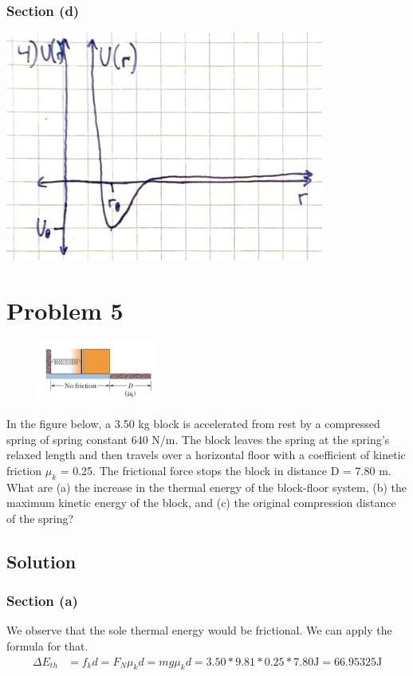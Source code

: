\documentclass[12pt]{article}
\begin{document}
\subsubsection*{Section (d)}
\begin{center} \includegraphics[height=0.4\textheight]{graph_4s.JPG} \end{center}


\pagebreak
\section*{Problem 5}
\begin{figure}
    \vspace{-30pt}
    \includegraphics[width=0.35\textwidth]{graph_5.png} 
\end{figure}
In the figure below, a 3.50 kg block is accelerated from rest by a compressed spring of spring constant 640 N/m. The block leaves the spring at the spring's relaxed length and then travels over a horizontal floor with a coefficient of kinetic friction $\mu_k$ = 0.25. The frictional force stops the block in distance D = 7.80 m. What are (a) the increase in the thermal energy of the block-floor system, (b) the maximum kinetic energy of the block, and (c) the original compression distance of the spring?

\subsection*{Solution}
\subsubsection*{Section (a)}
We observe that the sole thermal energy would be frictional. We can apply the formula for that.
\begin{align*}
    \Delta E_{th}   &=  f_k d
        =   F_N \mu_k d
        =   mg\mu_k d
        =   3.50*9.81*0.25*7.80 \unit{\joule}
        = \boxed{66.95325\unit{\joule}}
\end{align*}
\end{document}
